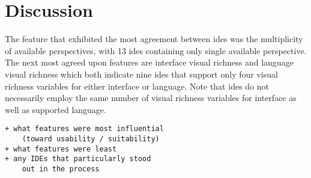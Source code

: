\section{Discussion}
\label{sec:discussion}

The feature that exhibited the most agreement between \acp{ide} was the
multiplicity of available perspectives, with 13 \acp{ide} containing only
single available perspective. The next most agreed upon features are
interface visual richness and language visual richness which both indicate
nine \acp{ide} that support only four visual richness variables for either
interface or language. Note that \acp{ide} do not necessarily employ the
same number of visual richness variables for interface as well as supported
language.


\begin{verbatim}
+ what features were most influential
    (toward usability / suitability)
+ what features were least
+ any IDEs that particularly stood
    out in the process
\end{verbatim}

